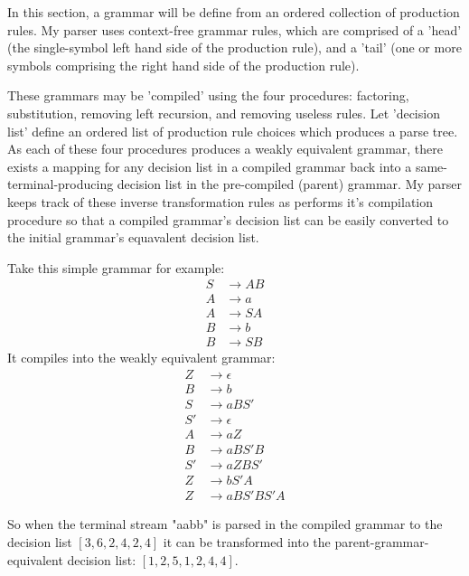 \documentclass[11pt]{article}
\begin{document}
In this section, a grammar will be define from an ordered collection of production rules.
My parser uses context-free grammar rules, which are comprised of a
'head' (the single-symbol left hand side of the production rule), and a 'tail'
(one or more symbols comprising the right hand side of the production rule).

These grammars may be 'compiled' using the four procedures:
factoring, substitution, removing left recursion, and removing useless
rules. Let 'decision list' define an ordered list of production rule
choices which produces a parse tree.
As each of these four procedures produces a weakly equivalent grammar,
there exists a mapping for any decision list in a compiled grammar
back into a same-terminal-producing decision list in the pre-compiled (parent) grammar.
My parser keeps track of these inverse transformation rules as performs
it's compilation procedure so that a compiled grammar's decision list can be easily
converted to the initial grammar's equavalent decision list. 

Take this simple grammar for example:
\setcounter{equation}{0}
\begin{align}
S &\rightarrow A B\\
A &\rightarrow a\\
A &\rightarrow S A\\
B &\rightarrow b\\
B &\rightarrow S B
\end{align}
It compiles into the weakly equivalent grammar:
\setcounter{equation}{0}
\begin{align}
Z &\rightarrow \epsilon\\
B &\rightarrow b\\
S &\rightarrow a B S'\\
S' &\rightarrow \epsilon\\
A &\rightarrow a Z\\
B &\rightarrow a B S' B\\
S' &\rightarrow a Z B S'\\
Z &\rightarrow b S' A\\
Z &\rightarrow a B S' B S' A
\end{align}

So when the terminal stream "aabb" is parsed in the compiled
grammar to the decision list $[3, 6, 2, 4, 2, 4]$ it can be transformed
into the parent-grammar-equivalent decision list: $[1, 2, 5, 1, 2, 4, 4]$.
\end{document}
